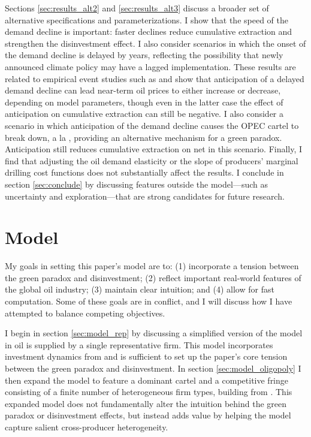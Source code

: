 \documentclass[12pt]{article}
\begin{document}
Sections \ref{sec:results_alt2} and \ref{sec:results_alt3} discuss a broader set of alternative specifications and parameterizations. I show that the speed of the demand decline is important: faster declines reduce cumulative extraction and strengthen the disinvestment effect. I also consider scenarios in which the onset of the demand decline is delayed by years, reflecting the possibility that newly announced climate policy may have a lagged implementation. These results are related to empirical event studies such as \cite{normanschlenker2024} and show that anticipation of a delayed demand decline can lead near-term oil prices to either increase or decrease, depending on model parameters, though even in the latter case the effect of anticipation on cumulative extraction can still be negative. I also consider a scenario in which anticipation of the demand decline causes the OPEC cartel to break down, a la \cite{rotembergsaloner1986}, providing an alternative mechanism for a green paradox. Anticipation still reduces cumulative extraction on net in this scenario. Finally, I find that adjusting the oil demand elasticity or the slope of producers' marginal drilling cost functions does not substantially affect the results. I conclude in section \ref{sec:conclude} by discussing features outside the model---such as uncertainty and exploration---that are strong candidates for future research.




\section{Model} \label{sec:model}

My goals in setting this paper's model are to: (1) incorporate a tension between the green paradox and disinvestment; (2) reflect important real-world features of the global oil industry; (3) maintain clear intuition; and (4) allow for fast computation. Some of these goals are in conflict, and I will discuss how I have attempted to balance competing objectives.

I begin in section \ref{sec:model_rep} by discussing a simplified version of the model in oil is supplied by a single representative firm. This model incorporates investment dynamics from \cite{aks2018} and is sufficient to set up the paper's core tension between the green paradox and disinvestment. In section \ref{sec:model_oligopoly} I then expand the model to feature a dominant cartel and a competitive fringe consisting of a finite number of heterogeneous firm types, building from \cite{salant1976}. This expanded model does not fundamentally alter the intuition behind the green paradox or disinvestment effects, but instead adds value by helping the model capture salient cross-producer heterogeneity.
\end{document}
